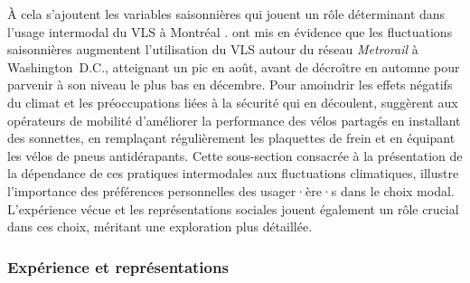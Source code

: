 \begin{refsegment}
À cela s'ajoutent les variables saisonnières qui jouent un rôle déterminant dans l'usage intermodal du \acrshort{VLS} à Montréal \textcolor{blue}{\autocite[111]{bachand-marleau_much-anticipated_2011}}. \textcolor{blue}{\textcite[377]{ma_estimating_2019}} ont mis en évidence que les fluctuations saisonnières augmentent l'utilisation du \acrshort{VLS} autour du réseau \textsl{Metrorail} à Washington~D.C., atteignant un pic en août, avant de décroître en automne pour parvenir à son niveau le plus bas en décembre. Pour amoindrir les effets négatifs du climat et les préoccupations liées à la sécurité qui en découlent, \textcolor{blue}{\textcite[68]{ma_understanding_2018}} suggèrent aux opérateurs de mobilité d'améliorer la performance des vélos partagés en installant des sonnettes, en remplaçant régulièrement les plaquettes de frein et en équipant les vélos de pneus antidérapants. Cette sous-section consacrée à la présentation de la dépendance de ces pratiques intermodales aux fluctuations climatiques, illustre l'importance des préférences personnelles des usager·ère·s dans le choix modal. L'expérience vécue et les représentations sociales jouent également un rôle crucial dans ces choix, méritant une exploration plus détaillée.%

\subsubsection*{Expérience et représentations
    \label{chap2:experience-representations}
    }
    

\end{refsegment}
